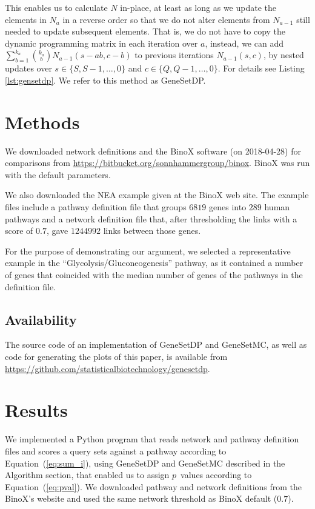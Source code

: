 \documentclass[a4paper,american]{lipics-v2016}
\begin{document}
This enables us to calculate $N$ in-place, at least as long as we update the elements in $N_a$ in a reverse order so that we do not alter elements from $N_{a-1}$ still needed to update subsequent elements. That is, we do not have to copy the dynamic programming matrix in each iteration over $a$, instead, we can add $\sum_{b=1}^{k_a}{k_a \choose b} N_{a-1}(s-ab,c-b)$ to previous iterations $N_{a-1}(s,c)$, by nested updates over $s \in \{ S, S-1, \ldots, 0 \}$ and $c \in \{ Q, Q-1, \ldots, 0 \}$. For details see Listing \ref{lst:gensetdp}. We refer to this method as GeneSetDP.

\section*{Methods}

We downloaded network definitions and the BinoX software (on 2018-04-28) for comparisons from \url{https://bitbucket.org/sonnhammergroup/binox}. BinoX was run with the default parameters.

We also downloaded the NEA example given at the BinoX web site. The example files include a pathway definition file that groups $6819$ genes into $289$ human pathways and a network definition file that, after thresholding the links with a score of $0.7$, gave $1244992$ links between those genes.

For the purpose of demonstrating our argument, we selected a representative example in the ``Glycolysis/Gluconeogenesis'' pathway, as it contained a number of genes that coincided with the median number of genes of the pathways in the definition file.

\subsection*{Availability}

The source code of an implementation of GeneSetDP and GeneSetMC, as well as code for generating the plots of this paper, is available from \url{https://github.com/statisticalbiotechnology/genesetdp}.

\section*{Results}

We implemented a Python program that reads network and pathway definition files and scores a query sets against a pathway according to Equation~(\ref{eq:sum_i}), using GeneSetDP and GeneSetMC described in the Algorithm section, that enabled us to assign $p$~values according to Equation~(\ref{eq:pval}). We downloaded pathway and network definitions from the BinoX's website and used the same network threshold as BinoX default ($0.7$).
\end{document}
